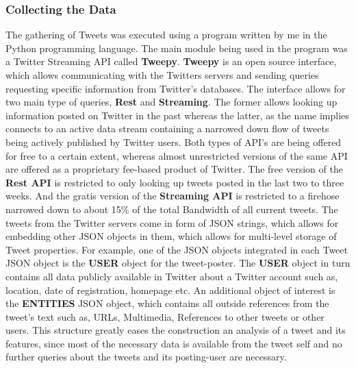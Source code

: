 		\subsubsection*{Collecting the Data}
		The gathering of Tweets was executed using a program written by me in the Python programming language. The main module being used in the program was a Twitter Streaming API called \textbf{Tweepy}. \textbf{Tweepy} is an open source interface, which allows communicating with the Twitters servers and sending queries requesting specific information from Twitter's databases. The interface allows for two main type of queries, \textbf{Rest} and \textbf{Streaming}. The former allows looking up information posted on Twitter in the past whereas the latter, as the name implies connects to an active data stream containing a narrowed down flow of tweets being actively published by Twitter users. Both types of API's are being offered for free to a certain extent, whereas almost unrestricted versions of the same API are offered as a proprietary fee-based product of Twitter. The free version of the \textbf{Rest API} is restricted to only looking up tweets posted in the last two to three weeks. And the gratis version of the \textbf{Streaming API} is restricted to a firehose narrowed down to about 15\% of the total Bandwidth of all current tweets.
		The tweets from the Twitter servers come in form of JSON strings, which allows for embedding other JSON objects in them, which allows for multi-level storage of Tweet properties. For example, one of the JSON objects integrated in each Tweet JSON object is the \textbf{USER} object for the tweet-poster. The \textbf{USER} object in turn contains all data publicly available in Twitter about a Twitter account such as, location, date of registration, homepage etc. An additional object of interest is the \textbf{ENTITIES} JSON object, which contains all outside references from the tweet's text such as, URLs, Multimedia, References to other tweets or other users. 
		This structure greatly eases the construction an analysis of a tweet and its features, since most of the necessary data is available from the tweet self and no further queries about the tweets and its posting-user are necessary.
		
